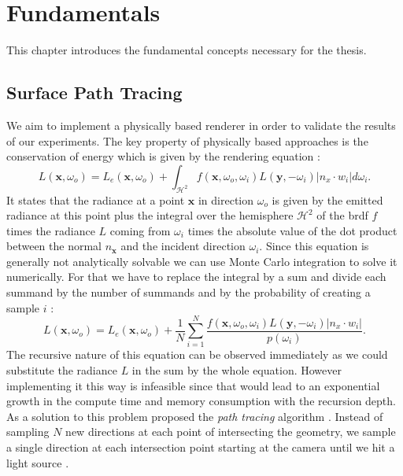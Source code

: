 \chapter{Fundamentals}
\label{chap:fundamentals}
This chapter introduces the fundamental concepts necessary for the thesis.

\section{Surface Path Tracing}
We aim to implement a physically based renderer in order to validate the results of our experiments.
The key property of physically based approaches is the conservation of energy which is given by the rendering equation \cite{rendering_equation}:
\begin{equation}
    \label{eq:render_equation}
    L(\boldsymbol{x}, \omega_o) = L_e(\boldsymbol{x}, \omega_o) + \int_{\mathcal{H}^2} f(\boldsymbol{x}, \omega_o, \omega_i) L(\boldsymbol{y}, -\omega_i) |n_x \cdot w_i| d\omega_i.
\end{equation}
It states that the radiance at a point $\boldsymbol{x}$ in direction $\omega_o$ is given by the emitted radiance at this point plus the integral over the hemisphere $\mathcal{H}^2$ of the \ac{brdf} $f$ times the radiance $L$ coming from $\omega_i$ times the absolute value of the dot product between the normal $n_\textbf{x}$ and the incident direction $\omega_i$.
Since this equation is generally not analytically solvable we can use Monte Carlo integration to solve it numerically.
For that we have to replace the integral by a sum and divide each summand by the number of summands and by the probability of creating a sample $i$ \cite{pbr}:
\begin{equation*}
    L(\boldsymbol{x}, \omega_o) = L_e(\boldsymbol{x}, \omega_o) + \frac{1}{N}\sum_{i=1}^{N} \frac{f(\boldsymbol{x}, \omega_o, \omega_i) L(\boldsymbol{y}, -\omega_i) |n_x \cdot w_i|}{p(\omega_i)}.
\end{equation*}
The recursive nature of this equation can be observed immediately as we could substitute the radiance $L$ in the sum by the whole equation.
However implementing it this way is infeasible since that would lead to an exponential growth in the compute time and memory consumption with the recursion depth.
As a solution to this problem \citeauthor{rendering_equation} proposed the \textit{path tracing} algorithm \cite{rendering_equation}.
Instead of sampling $N$ new directions at each point of intersecting the geometry, we sample a single direction at each intersection point starting at the camera until we hit a light source \cite{rendering_equation}.
